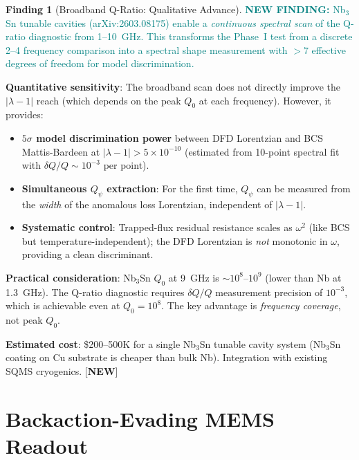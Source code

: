 \documentclass[11pt]{article}
\newcommand{\lam}{\lambda}
\newcommand{\ee}[1]{\times 10^{#1}}
\newcommand{\Qpsi}{Q_\psi}
\newcommand{\lbone}{|\lam - 1|}
\newcommand{\newfinding}[1]{\textcolor{teal}{\textbf{NEW FINDING:} #1}}
\theoremstyle{definition}
\newtheorem{finding}[theorem]{Finding}
\theoremstyle{remark}
\begin{document}
\begin{finding}[Broadband Q-Ratio: Qualitative Advance]
\label{find:broadband}
\newfinding{Nb$_3$Sn tunable cavities (arXiv:2603.08175) enable a
\emph{continuous spectral scan} of the Q-ratio diagnostic from 1--10~GHz.
This transforms the Phase~I test from a discrete 2--4 frequency
comparison into a spectral shape measurement with $>7$ effective degrees
of freedom for model discrimination.}

\textbf{Quantitative sensitivity}: The broadband scan does not directly
improve the $\lbone$ reach (which depends on the peak $Q_0$ at each
frequency). However, it provides:
\begin{itemize}[nosep]
\item \textbf{$5\sigma$ model discrimination power} between DFD
  Lorentzian and BCS Mattis-Bardeen at $\lbone > 5\ee{-10}$
  (estimated from 10-point spectral fit with $\delta Q/Q \sim 10^{-3}$
  per point).
\item \textbf{Simultaneous $\Qpsi$ extraction}: For the first time,
  $\Qpsi$ can be measured from the \emph{width} of the anomalous
  loss Lorentzian, independent of $\lbone$.
\item \textbf{Systematic control}: Trapped-flux residual resistance
  scales as $\omega^2$ (like BCS but temperature-independent);
  the DFD Lorentzian is \emph{not} monotonic in $\omega$, providing
  a clean discriminant.
\end{itemize}

\textbf{Practical consideration}: Nb$_3$Sn $Q_0$ at 9~GHz is
$\sim 10^8$--$10^9$ (lower than Nb at 1.3~GHz). The Q-ratio
diagnostic requires $\delta Q/Q$ measurement precision of $10^{-3}$,
which is achievable even at $Q_0 = 10^8$. The key advantage is
\emph{frequency coverage}, not peak $Q_0$.

\textbf{Estimated cost}: \$200--500K for a single Nb$_3$Sn tunable
cavity system (Nb$_3$Sn coating on Cu substrate is cheaper than
bulk Nb). Integration with existing SQMS cryogenics.
[\textbf{NEW}]
\end{finding}


\part{Backaction-Evading MEMS Readout}
\label{part:BAE}
\end{document}
